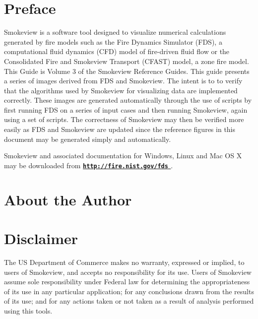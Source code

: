 \documentclass[11pt,twoside]{book}
\newcommand{\hhref}[1]{\href{#1}{{\tt #1}
}}
\begin{document}
\chapter{Preface}
Smokeview is a software tool designed to visualize numerical
calculations generated by fire models such as the Fire Dynamics Simulator (FDS),
a computational fluid dynamics (CFD) model of fire-driven fluid
flow or the Consolidated Fire and Smokeview Transport (CFAST) model, a zone fire model. This Guide is Volume 3 of the Smokeview Reference
Guides.
This guide presents a series of images derived from FDS and Smokeview.  The intent is to to verify that the algorithms used by Smokeview for visualizing data are implemented correctly.  These images are generated automatically through the use of scripts by first running FDS on a series of input cases and then running Smokeview, again using a set of scripts.  The correctness of Smokeview may then be verified more easily as FDS and Smokeview are updated since the reference figures in this document may be generated simply and automatically.

Smokeview and associated
documentation for Windows, Linux and Mac OS X may be downloaded from  {\bf
\hhref{http://fire.nist.gov/fds}} .


\chapter{About the Author}
\begin{description}
\gforneybio
\end{description}


\chapter{Disclaimer}

The US Department of Commerce makes no warranty,
expressed or implied, to users of Smokeview, and accepts no
responsibility for its use. Users of Smokeview assume sole
responsibility under Federal law for determining the
appropriateness of its use in any particular application; for any
conclusions drawn from the results of its use; and for any actions
taken or not taken as a result of analysis performed using this
tools.
\end{document}
